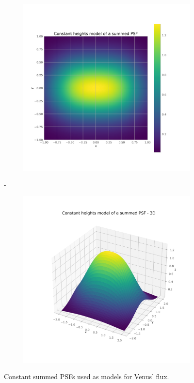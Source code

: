         \begin{figure}[H]
        \centering
        \begin{subfigure}{.45\textwidth}
            \includegraphics[width=\textwidth]{report/Figures/models/model_psf_const.png}
        \end{subfigure}%
        \hspace{1em}-
        \begin{subfigure}{.45\textwidth}
            \centering
            \includegraphics[width=\textwidth]{report/Figures/models/model_psf_const_3d.png}
        \end{subfigure}
        \caption{Constant summed PSFs used as models for Venus' flux.}
        \label{model_psf_const}
        \end{figure}


